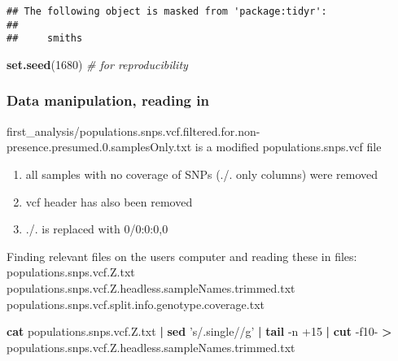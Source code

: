 \documentclass[]{article}
\newenvironment{Shaded}{\begin{snugshade}}{\end{snugshade}}
\newcommand{\KeywordTok}[1]{\textcolor[rgb]{0.13,0.29,0.53}{\textbf{{#1}}}}
\newcommand{\DecValTok}[1]{\textcolor[rgb]{0.00,0.00,0.81}{{#1}}}
\newcommand{\StringTok}[1]{\textcolor[rgb]{0.31,0.60,0.02}{{#1}}}
\newcommand{\CommentTok}[1]{\textcolor[rgb]{0.56,0.35,0.01}{\textit{{#1}}}}
\newcommand{\NormalTok}[1]{{#1}}
\providecommand{\tightlist}{%
  \setlength{\itemsep}{0pt}\setlength{\parskip}{0pt}}
\begin{document}
\begin{verbatim}
## The following object is masked from 'package:tidyr':
## 
##     smiths
\end{verbatim}

\begin{Shaded}
\begin{Highlighting}[]
\KeywordTok{set.seed}\NormalTok{(}\DecValTok{1680}\NormalTok{) }\CommentTok{# for reproducibility}
\end{Highlighting}
\end{Shaded}

\subsubsection{Data manipulation, reading
in}\label{data-manipulation-reading-in}

first\_analysis/populations.snps.vcf.filtered.for.non-presence.presumed.0.samplesOnly.txt
is a modified populations.snps.vcf file

\begin{enumerate}
\def\labelenumi{\arabic{enumi}.}
\tightlist
\item
  all samples with no coverage of SNPs (./. only columns) were removed
\item
  vcf header has also been removed
\item
  ./. is replaced with 0/0:0:0,0
\end{enumerate}

Finding relevant files on the users computer and reading these in files:
populations.snps.vcf.Z.txt
populations.snps.vcf.Z.headless.sampleNames.trimmed.txt
populations.snps.vcf.split.info.genotype.coverage.txt

\begin{Shaded}
\begin{Highlighting}[]
\KeywordTok{cat} \NormalTok{populations.snps.vcf.Z.txt }\KeywordTok{|} \KeywordTok{sed} \StringTok{'s/.single//g'} \KeywordTok{|} \KeywordTok{tail} \NormalTok{-n +15 }\KeywordTok{|} \KeywordTok{cut} \NormalTok{-f10- }\KeywordTok{>} \NormalTok{populations.snps.vcf.Z.headless.sampleNames.trimmed.txt}
\end{Highlighting}
\end{Shaded}

\begin{Shaded}
\end{Shaded}
\end{document}
